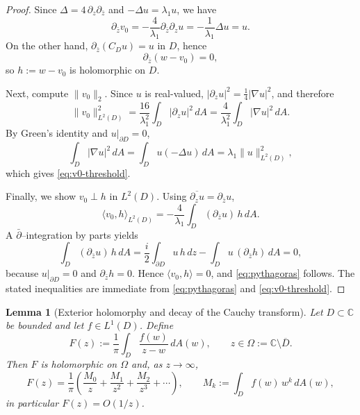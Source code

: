 \documentclass{amsart}
\newcommand{\C}{\mathbb{C}}
\theoremstyle{plain}
\newtheorem{lemma}[theorem]{Lemma}
\theoremstyle{remark}
\begin{document}
\begin{proof}
Since $\Delta=4\,\partial_z\partial_{\bar z}$ and $-\Delta u=\lambda_1 u$, we have
\[
\partial_{\bar z}v_0
=-\frac{4}{\lambda_1}\partial_{\bar z}\partial_z u
=-\frac{1}{\lambda_1}\Delta u
=u.
\]
On the other hand, $\partial_{\bar z}(C_D u)=u$ in $D$, hence
\[
\partial_{\bar z}(w-v_0)=0,
\]
so $h:=w-v_0$ is holomorphic on $D$.

Next, compute $\|v_0\|_2$. Since $u$ is real-valued, $|\partial_z u|^2=\frac14|\nabla u|^2$, and therefore
\[
\|v_0\|_{L^2(D)}^2
=\frac{16}{\lambda_1^2}\int_D |\partial_z u|^2\,dA
=\frac{4}{\lambda_1^2}\int_D |\nabla u|^2\,dA.
\]
By Green's identity and $u|_{\partial D}=0$,
\[
\int_D |\nabla u|^2\,dA=\int_D u(-\Delta u)\,dA=\lambda_1\|u\|_{L^2(D)}^2,
\]
which gives \eqref{eq:v0-threshold}.

Finally, we show $v_0\perp h$ in $L^2(D)$. Using $\overline{\partial_z u}=\partial_{\bar z}u$,
\[
\langle v_0,h\rangle_{L^2(D)}
=-\frac{4}{\lambda_1}\int_D (\partial_{\bar z}u)\,h\,dA.
\]
A $\bar\partial$--integration by parts yields
\[
\int_D (\partial_{\bar z}u)\,h\,dA
=\frac{i}{2}\int_{\partial D}u\,h\,dz-\int_D u\,(\partial_{\bar z}h)\,dA=0,
\]
because $u|_{\partial D}=0$ and $\partial_{\bar z}h=0$. Hence $\langle v_0,h\rangle=0$, and
\eqref{eq:pythagoras} follows. The stated inequalities are immediate from
\eqref{eq:pythagoras} and \eqref{eq:v0-threshold}.
\end{proof}




\begin{lemma}[Exterior holomorphy and decay of the Cauchy transform]\label{lem:ext-holo-decay}
Let $D\subset\C$ be bounded and let $f\in L^1(D)$. Define
\[
F(z):=\frac1\pi\int_D \frac{f(w)}{z-w}\,dA(w),\qquad z\in\Omega:=\C\setminus\overline D.
\]
Then $F$ is holomorphic on $\Omega$ and, as $z\to\infty$,
\[
F(z)=\frac{1}{\pi}\left(\frac{M_0}{z}+\frac{M_1}{z^2}+\frac{M_2}{z^3}+\cdots\right),
\qquad
M_k:=\int_D f(w)\,w^k\,dA(w),
\]
in particular $F(z)=O(1/z)$.
\end{lemma}
\end{document}

